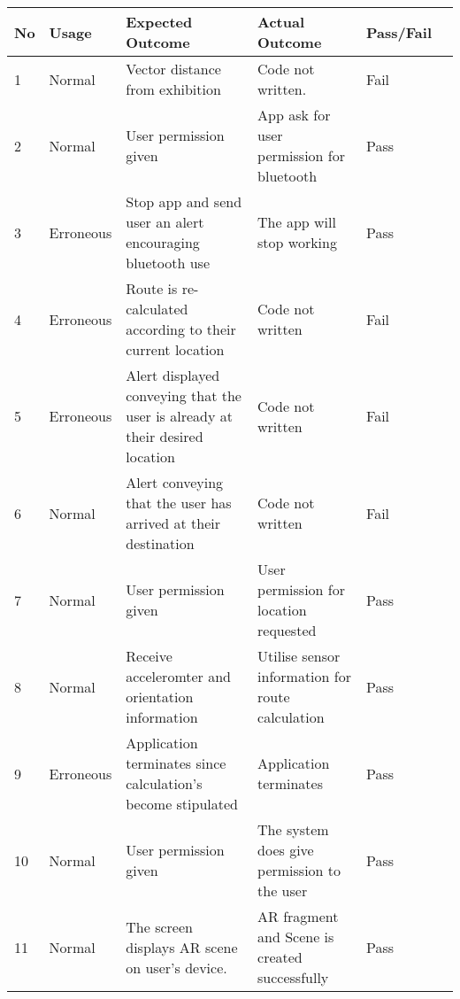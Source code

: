 \newpage
{}
\begin{turn}{-0}
\begin{tabular}{ | l | l | p{9cm} | p{10.5cm} | l | l |}
\hline
	\textbf{No} & \textbf{Usage} & \textbf{Expected Outcome} & \textbf{Actual Outcome} & \textbf{Pass/Fail}\\ \hline
	
	1 & Normal & Vector distance from exhibition & Code not written.& \cellcolor{red}Fail\\ \hline
	
	2 & Normal & User permission given & App ask for user permission for bluetooth & \cellcolor{green}Pass \\ \hline
	
	3 & Erroneous & Stop app and send user an alert encouraging bluetooth use & The app will stop working & \cellcolor{green}Pass\\ \hline
	
	4 & Erroneous & Route is re-calculated according to their current location & Code not written & \cellcolor{red}Fail\\ \hline
	
	5 & Erroneous & Alert displayed conveying that the user is already at their desired location & Code not written & \cellcolor{red}Fail\\ \hline
	
	6 & Normal & Alert conveying that the user has arrived at their destination & Code not written & \cellcolor{red}Fail\\ \hline
	
	7 & Normal & User permission given & User permission for location requested & \cellcolor{green}Pass\\ \hline
	
	8 & Normal & Receive acceleromter and orientation information & Utilise sensor information for route calculation & \cellcolor{green}Pass\\ \hline
	
	9 & Erroneous & Application terminates since calculation's become stipulated & Application terminates & \cellcolor{green}Pass\\ \hline
	
	10 & Normal & User permission given & The system does give permission to the user & \cellcolor{green}Pass\\ \hline
	
	11 & Normal & The screen displays AR scene on user's device. & AR fragment and Scene is created successfully & \cellcolor{green}Pass\\ \hline
	

\end{tabular}
\end{turn}
